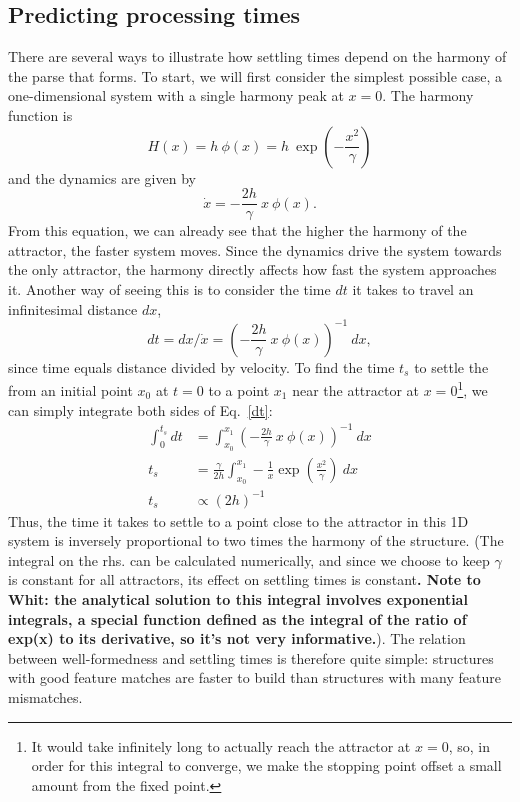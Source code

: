 \documentclass[10pt,letterpaper]{article}
\begin{document}
\subsection{Predicting processing times}
There are several ways to illustrate how settling times depend on the harmony of the parse that forms. To start, we will first consider the simplest possible case, a one-dimensional system with a single harmony peak at $x = 0$. The harmony function is $$H(x) = h~\phi(x) = h~\exp\left(-\frac{x^2}{\gamma} \right)$$ and the dynamics are given by 
\begin{equation}\label{dyn1d}
\dot{x} = -\frac{2h}{\gamma}~x~\phi(x).
\end{equation}
From this equation, we can already see that the higher the harmony of the attractor, the faster system moves. Since the dynamics drive the system towards the only attractor, the harmony directly affects how fast the system approaches it. Another way of seeing this is to consider the time $dt$ it takes to travel an infinitesimal distance $dx$,
\begin{equation}\label{dt}
dt  = dx/\dot{x} = \left(-\frac{2h}{\gamma}~x~\phi(x)\right)^{-1}~dx,
\end{equation}
since time equals distance divided by velocity. To find the time $t_s$ to settle the from an initial point $x_0$ at $t = 0$ to a point $x_1$ near the attractor at $x = 0$\footnote{It would take infinitely long to actually reach the attractor at $x = 0$, so, in order for this integral to converge, we make the stopping point offset a small amount from the fixed point.}, we can simply integrate both sides of Eq.~\ref{dt}:
\begin{align}\label{ts}
\int_{0}^{t_s} dt & = \int_{x_0}^{x_1} \left(-\frac{2h}{\gamma}~x~\phi(x)\right)^{-1}~dx \nonumber \\
t_s & = \frac{\gamma}{2h} \int_{x_0}^{x_1} -\frac{1}{x}\exp\left(\frac{x^2}{\gamma} \right)~dx \nonumber \\
t_s & \propto (2h)^{-1}
\end{align}
Thus, the time it takes to settle to a point close to the attractor in this 1D system is inversely proportional to two times the harmony of the structure. (The integral on the rhs. can be calculated numerically, and since we choose to keep $\gamma$ is constant for all attractors, its effect on settling times is constant\textbf{. Note to Whit: the analytical solution to this integral involves exponential integrals, a special function defined as the integral of the ratio of exp(x) to its derivative, so it's not very informative.}). The relation between well-formedness and settling times is therefore quite simple: structures with good feature matches are faster to build than structures with many feature mismatches.
\end{document}
